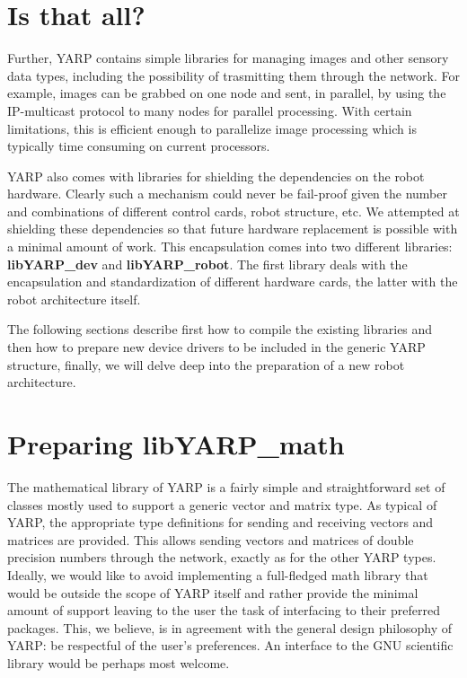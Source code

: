 \section{Is that all?}
Further, YARP contains simple libraries for managing images and other sensory data types, including the possibility of trasmitting them through the network. For example, images can be grabbed on one node and sent, in parallel, by using the IP-multicast protocol to many nodes for parallel processing. With certain limitations, this is efficient enough to parallelize image processing which is typically time consuming on current processors.

YARP also comes with libraries for shielding the dependencies on the robot hardware. Clearly such a mechanism could never be fail-proof given the number and combinations of different control cards, robot structure, etc. We attempted at shielding these dependencies so that future hardware replacement is possible with a minimal amount of work. This encapsulation comes into two different libraries: {\bf libYARP\_dev} and {\bf libYARP\_robot}. The first library deals with the encapsulation and standardization of different hardware cards, the latter with the robot architecture itself.

The following sections describe first how to compile the existing libraries and then how to prepare new device drivers to be included in the generic YARP structure, finally, we will delve deep into the preparation of a new robot architecture.
 
\section{Preparing libYARP\_math}
The mathematical library of YARP is a fairly simple and straightforward set of classes mostly used to support a generic vector and matrix type. As typical of YARP, the appropriate type definitions for sending and receiving vectors and matrices are provided. This allows sending vectors and matrices of double precision numbers through the network, exactly as for the other YARP types. Ideally, we would like to avoid implementing a full-fledged math library that would be outside the scope of YARP itself and rather provide the minimal amount of support leaving to the user the task of interfacing to their preferred packages. This, we believe, is in agreement with the general design philosophy of YARP: be respectful of the user's preferences. An interface to the GNU scientific library would be perhaps most welcome.

